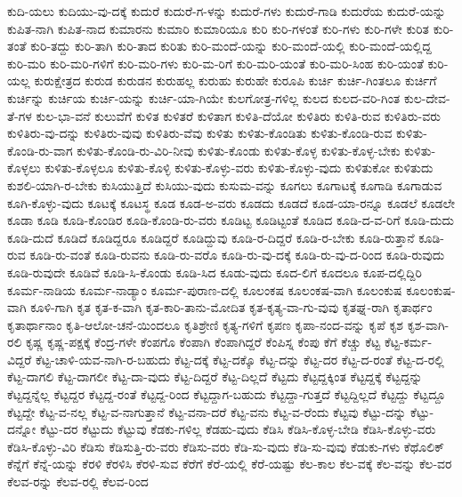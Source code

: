 {ಕುದಿ-ಯಲು
ಕುದಿಯು-ವು-ದಕ್ಕೆ
ಕುದುರೆ
ಕುದುರೆ-ಗ-ಳನ್ನು
ಕುದುರೆ-ಗಳು
ಕುದುರೆ-ಗಾಡಿ
ಕುದುರೆಯ
ಕುದುರೆ-ಯನ್ನು
ಕುಪಿತ-ನಾಗಿ
ಕುಪಿತ-ನಾದ
ಕುಮಾರನು
ಕುಮಾರಿ
ಕುಮಾರಿಯೂ
ಕುರಿ
ಕುರಿ-ಗಳಂತೆ
ಕುರಿ-ಗಳು
ಕುರಿ-ಗಳೇ
ಕುರಿತ
ಕುರಿ-ತಂತೆ
ಕುರಿ-ತದ್ದು
ಕುರಿ-ತಾಗಿ
ಕುರಿ-ತಾದ
ಕುರಿತು
ಕುರಿ-ಮಂದೆ-ಯನ್ನು
ಕುರಿ-ಮಂದೆ-ಯಲ್ಲಿ
ಕುರಿ-ಮಂದೆ-ಯಲ್ಲಿದ್ದ
ಕುರಿ-ಮರಿ
ಕುರಿ-ಮರಿ-ಗಳಿಗೆ
ಕುರಿ-ಮರಿ-ಗಳು
ಕುರಿ-ಮ-ರಿಗೆ
ಕುರಿ-ಮರಿ-ಯಂತೆ
ಕುರಿ-ಮರಿ-ಸಿಂಹ
ಕುರಿ-ಯಂತೆ
ಕುರಿ-ಯಲ್ಲ
ಕುರುಕ್ಷೇತ್ರದ
ಕುರುಡ
ಕುರುಡನ
ಕುರುಹಲ್ಲ
ಕುರುಹು
ಕುರುಹೇ
ಕುರೂಪಿ
ಕುರ್ಚಿ
ಕುರ್ಚಿ-ಗಿಂತಲೂ
ಕುರ್ಚಿಗೆ
ಕುರ್ಚಿನ್ನು
ಕುರ್ಚಿಯ
ಕುರ್ಚಿ-ಯನ್ನು
ಕುರ್ಚಿ-ಯಾ-ಗಿಯೇ
ಕುಲಗೋತ್ರ-ಗಳಿಲ್ಲ
ಕುಲದ
ಕುಲದ-ವರಿ-ಗಿಂತ
ಕುಲ-ದೇವ-ತೆ-ಗಳ
ಕುಲ-ಭಾ-ವನೆ
ಕುಲುವೆಗೆ
ಕುಳಿತ
ಕುಳಿತರೆ
ಕುಳಿತಾಗ
ಕುಳಿತಿ-ದೆಯೋ
ಕುಳಿತಿರು
ಕುಳಿತಿ-ರುವ
ಕುಳಿತಿರು-ವರು
ಕುಳಿತಿರು-ವು-ದನ್ನು
ಕುಳಿತಿರು-ವುವು
ಕುಳಿತಿರು-ವೆವು
ಕುಳಿತು
ಕುಳಿತು-ಕೊಂಡಿತು
ಕುಳಿತು-ಕೊಂಡಿ-ರುವ
ಕುಳಿತು-ಕೊಂಡಿ-ರು-ವಾಗ
ಕುಳಿತು-ಕೊಂಡಿ-ರು-ವಿರಿ-ನೀವು
ಕುಳಿತು-ಕೊಂಡು
ಕುಳಿತು-ಕೊಳ್ಳ
ಕುಳಿತು-ಕೊಳ್ಳ-ಬೇಕು
ಕುಳಿತು-ಕೊಳ್ಳಲು
ಕುಳಿತು-ಕೊಳ್ಳಲೂ
ಕುಳಿತು-ಕೊಳ್ಳಿ
ಕುಳಿತು-ಕೊಳ್ಳು-ವರು
ಕುಳಿತು-ಕೊಳ್ಳು-ವುದು
ಕುಳಿತುಕೋ
ಕುಳಿತುದು
ಕುಶಲಿ-ಯಾಗಿ-ರ-ಬೇಕು
ಕುಸಿಯುತ್ತಿದೆ
ಕುಸಿಯು-ವುದು
ಕುಸುಮ-ವನ್ನು
ಕೂಗಲು
ಕೂಗಾಟಕ್ಕೆ
ಕೂಗಾಡಿ
ಕೂಗಾಡುವ
ಕೂಗಿ-ಕೊಳ್ಳು-ವುದು
ಕೂಟಕ್ಕೆ
ಕೂಟಸ್ಥ
ಕೂಡ
ಕೂಡ-ಅ-ವರು
ಕೂಡದು
ಕೂಡದೆ
ಕೂಡ-ಯಾ-ರನ್ನೂ
ಕೂಡಲೆ
ಕೂಡಲೇ
ಕೂಡಾ
ಕೂಡಿ
ಕೂಡಿ-ಕೊಂಡಿರ
ಕೂಡಿ-ಕೊಂಡಿ-ರು-ವರು
ಕೂಡಿಟ್ಟ
ಕೂಡಿಟ್ಟಂತೆ
ಕೂಡಿದ
ಕೂಡಿ-ದ-ವ-ರಿಗೆ
ಕೂಡಿ-ದುದು
ಕೂಡಿ-ದುದೆ
ಕೂಡಿದೆ
ಕೂಡಿದ್ದರೂ
ಕೂಡಿದ್ದರೆ
ಕೂಡಿದ್ದುವು
ಕೂಡಿ-ರ-ದಿದ್ದರೆ
ಕೂಡಿ-ರ-ಬೇಕು
ಕೂಡಿ-ರುತ್ತಾನೆ
ಕೂಡಿ-ರುವ
ಕೂಡಿ-ರು-ವಂತೆ
ಕೂಡಿ-ರುವನು
ಕೂಡಿ-ರು-ವರೊ
ಕೂಡಿ-ರು-ವು-ದಕ್ಕೆ
ಕೂಡಿ-ರು-ವು-ದ-ರಿಂದ
ಕೂಡಿ-ರುವುದು
ಕೂಡಿ-ರುವುದೇ
ಕೂಡಿವೆ
ಕೂಡಿ-ಸಿ-ಕೊಂಡು
ಕೂಡಿ-ಸಿದ
ಕೂಡು-ವುದು
ಕೂದ-ಲಿಗೆ
ಕೂದಲೂ
ಕೂಪ-ದಲ್ಲಿದ್ದಿರಿ
ಕೂರ್ಮ-ನಾಡಿಯ
ಕೂರ್ಮ-ನಾಡ್ಯಾಂ
ಕೂರ್ಮ-ಪುರಾಣ-ದಲ್ಲಿ
ಕೂಲಂಕಷ
ಕೂಲಂಕಷ-ವಾಗಿ
ಕೂಲಂಕುಷ
ಕೂಲಂಕುಷ-ವಾಗಿ
ಕೂಳಿ-ಗಾಗಿ
ಕೃತ
ಕೃತ-ಕ-ವಾಗಿ
ಕೃತ-ಕಾರಿ-ತಾನು-ಮೋದಿತ
ಕೃತ-ಕೃತ್ಯ-ವಾ-ಗು-ವುವು
ಕೃತಘ್ನ-ರಾಗಿ
ಕೃತಾರ್ಥಂ
ಕೃತಾರ್ಥಾನಾಂ
ಕೃತಿ-ಆಲೋ-ಚನೆ-ಯಿಂದಲೂ
ಕೃತಿಶ್ರೇಣಿ
ಕೃತ್ಯ-ಗಳಿಗೆ
ಕೃಪಣ
ಕೃಪಾ-ನಂದ-ವನ್ನು
ಕೃಪೆ
ಕೃಶ
ಕೃಶ-ವಾಗಿ-ರಲಿ
ಕೃಷ್ಣ
ಕೃಷ್ಣ-ಪಕ್ಷಕ್ಕೆ
ಕೆಂದ್ರ-ಗಳೇ
ಕೆಂಪಗೊ
ಕೆಂಪಾಗಿ
ಕೆಂಪಾಗಿದ್ದರೆ
ಕೆಂಪಿಸ್ನ
ಕೆಂಪು
ಕೆಗೆ
ಕೆಚ್ಚು
ಕೆಟ್ಟ
ಕೆಟ್ಟ-ಕರ್ಮ-ವಿದ್ದರೆ
ಕೆಟ್ಟ-ಚಾಳಿ-ಯವ-ನಾಗಿ-ರ-ಬಹುದು
ಕೆಟ್ಟ-ದಕ್ಕೆ
ಕೆಟ್ಟ-ದಕ್ಕೊ
ಕೆಟ್ಟ-ದನ್ನು
ಕೆಟ್ಟ-ದರ
ಕೆಟ್ಟ-ದ-ರಂತೆ
ಕೆಟ್ಟ-ದ-ರಲ್ಲಿ
ಕೆಟ್ಟ-ದಾಗಲಿ
ಕೆಟ್ಟ-ದಾಗಲೀ
ಕೆಟ್ಟ-ದಾ-ವುದು
ಕೆಟ್ಟ-ದಿದ್ದರೆ
ಕೆಟ್ಟ-ದಿಲ್ಲದೆ
ಕೆಟ್ಟದು
ಕೆಟ್ಟದ್ದಕ್ಕಿಂತ
ಕೆಟ್ಟದ್ದಕ್ಕೆ
ಕೆಟ್ಟದ್ದನ್ನು
ಕೆಟ್ಟದ್ದನ್ನೆಲ್ಲ
ಕೆಟ್ಟದ್ದರ
ಕೆಟ್ಟದ್ದ-ರಂತೆ
ಕೆಟ್ಟದ್ದ-ರಿಂದ
ಕೆಟ್ಟದ್ದಾಗ-ಬಹುದು
ಕೆಟ್ಟದ್ದಾ-ಗುತ್ತದೆ
ಕೆಟ್ಟದ್ದಿಲ್ಲದೆ
ಕೆಟ್ಟದ್ದು
ಕೆಟ್ಟದ್ದೂ
ಕೆಟ್ಟದ್ದೇ
ಕೆಟ್ಟ-ವ-ನಲ್ಲ
ಕೆಟ್ಟ-ವ-ನಾಗುತ್ತಾನೆ
ಕೆಟ್ಟ-ವನಾ-ದರೆ
ಕೆಟ್ಟ-ವನು
ಕೆಟ್ಟ-ವ-ರೆಂದು
ಕೆಟ್ಟವು
ಕೆಟ್ಟು-ದನ್ನು
ಕೆಟ್ಟು-ದನ್ನೋ
ಕೆಟ್ಟು-ದರ
ಕೆಟ್ಟುದು
ಕೆಟ್ಟುವು
ಕೆಡಕು-ಗಳಿಲ್ಲ
ಕೆಡಹು-ವುದು
ಕೆಡಿಸಿ
ಕೆಡಿಸಿ-ಕೊಳ್ಳ-ಬೇಡಿ
ಕೆಡಿಸಿ-ಕೊಳ್ಳು-ವರು
ಕೆಡಿಸಿ-ಕೊಳ್ಳು-ವಿರಿ
ಕೆಡಿಸು
ಕೆಡಿಸುತ್ತಿ-ರು-ವರು
ಕೆಡಿಸು-ವರು
ಕೆಡಿ-ಸು-ವುದು
ಕೆಡಿ-ಸು-ವುವು
ಕೆಡುಕು-ಗಳು
ಕೆಥೊಲಿಕ್
ಕೆನ್ನೆಗೆ
ಕೆನ್ನೆ-ಯನ್ನು
ಕೆರಳಿ
ಕೆರಳಿಸಿ
ಕೆರಳಿ-ಸುವ
ಕೆರೆಗೆ
ಕೆರೆ-ಯಲ್ಲಿ
ಕೆರೆ-ಯಷ್ಟು
ಕೆಲ-ಕಾಲ
ಕೆಲ-ವಕ್ಕೆ
ಕೆಲ-ವನ್ನು
ಕೆಲ-ವರ
ಕೆಲವ-ರನ್ನು
ಕೆಲವ-ರಲ್ಲಿ
ಕೆಲವ-ರಿಂದ
}
